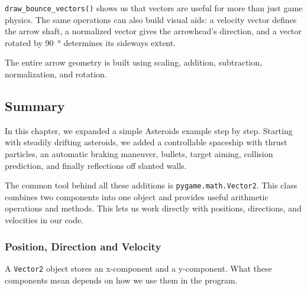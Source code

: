 \begin{hintbox}
	\texttt{draw\_bounce\_vectors()} shows us that vectors are useful for more than just game physics. The same operations can also build visual aids: a velocity vector defines the arrow shaft, a normalized vector gives the arrowhead's direction, and a vector rotated by \SI{90}{\degree} determines its sideways extent.
	
	The entire arrow geometry is built using scaling, addition, subtraction, normalization, and rotation.
\end{hintbox}


\subsection{Summary}\label{secVectorSummary}

In this chapter, we expanded a simple Asteroids example step by step. Starting with steadily drifting asteroids, we added a controllable spaceship with thrust particles, an automatic braking maneuver, bullets, target aiming, collision prediction, and finally reflections off slanted walls.

The common tool behind all these additions is \texttt{pygame.math.Vector2}. This class combines two components into one object and provides useful arithmetic operations and methods. This lets us work directly with positions, directions, and velocities in our code.

\newpage
\subsubsection*{Position, Direction and Velocity}

A \texttt{Vector2} object stores an x-component and a y-component. What these components mean depends on how we use them in the program.

